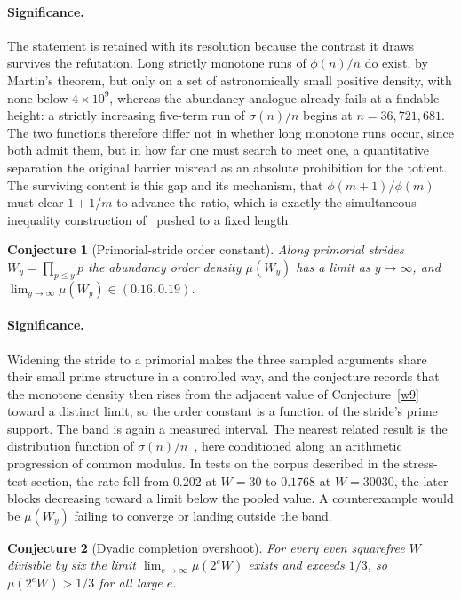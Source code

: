 \documentclass[11pt]{article}
\newtheorem{conjecture}{Conjecture}
\theoremstyle{definition}
\begin{document}
\paragraph{Significance.}
The statement is retained with its resolution because the contrast it draws survives the refutation.  Long strictly monotone runs of $\phi(n)/n$ do exist, by Martin's theorem, but only on a set of astronomically small positive density, with none below $4\times10^9$, whereas the abundancy analogue already fails at a findable height: a strictly increasing five-term run of $\sigma(n)/n$ begins at $n=36{,}721{,}681$.  The two functions therefore differ not in whether long monotone runs occur, since both admit them, but in how far one must search to meet one, a quantitative separation the original barrier misread as an absolute prohibition for the totient.  The surviving content is this gap and its mechanism, that $\phi(m+1)/\phi(m)$ must clear $1+1/m$ to advance the ratio, which is exactly the simultaneous-inequality construction of~\cite{Martin06} pushed to a fixed length.

\begin{conjecture}[Primorial-stride order constant]\label{w12}
Along primorial strides $W_y=\prod_{p\le y}p$ the abundancy order density $\mu(W_y)$ has a limit as $y\to\infty$, and $\lim_{y\to\infty}\mu(W_y)\in(0.16,0.19)$.
\end{conjecture}

\paragraph{Significance.}
Widening the stride to a primorial makes the three sampled arguments share their small prime structure in a controlled way, and the conjecture records that the monotone density then rises from the adjacent value of Conjecture~\ref{w9} toward a distinct limit, so the order constant is a function of the stride's prime support.  The band is again a measured interval.  The nearest related result is the distribution function of $\sigma(n)/n$~\cite{Ten}, here conditioned along an arithmetic progression of common modulus.  In tests on the corpus described in the stress-test section, the rate fell from $0.202$ at $W=30$ to $0.1768$ at $W=30030$, the later blocks decreasing toward a limit below the pooled value.  A counterexample would be $\mu(W_y)$ failing to converge or landing outside the band.

\begin{conjecture}[Dyadic completion overshoot]\label{w13}
For every even squarefree $W$ divisible by six the limit $\lim_{e\to\infty}\mu(2^eW)$ exists and exceeds $1/3$, so $\mu(2^eW)>1/3$ for all large $e$.
\end{conjecture}
\end{document}
